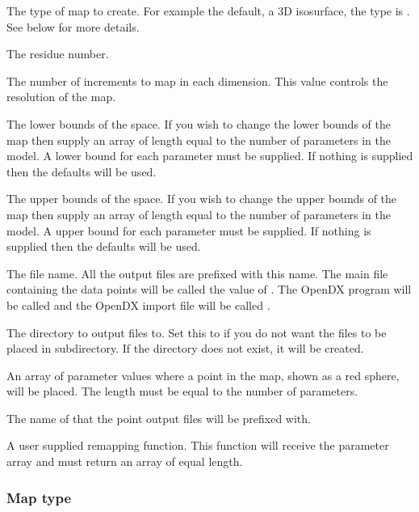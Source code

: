   The type of map to create.  For example the default, a 3D isosurface, the type is .  See below for more details. 

  The residue number. 

  The number of increments to map in each dimension.  This value controls the resolution of the map. 

  The lower bounds of the space.  If you wish to change the lower bounds of the map then supply an array of length equal to the number of parameters in the model.  A lower bound for each parameter must be supplied.  If nothing is supplied then the defaults will be used. 

  The upper bounds of the space.  If you wish to change the upper bounds of the map then supply an array of length equal to the number of parameters in the model.  A upper bound for each parameter must be supplied.  If nothing is supplied then the defaults will be used. 

  The file name.  All the output files are prefixed with this name.  The main file containing the data points will be called the value of .  The OpenDX program will be called  and the OpenDX import file will be called . 

  The directory to output files to.  Set this to  if you do not want the files to be placed in subdirectory.  If the directory does not exist, it will be created. 

  An array of parameter values where a point in the map, shown as a red sphere, will be placed.  The length must be equal to the number of parameters. 

  The name of that the point output files will be prefixed with. 

  A user supplied remapping function.  This function will receive the parameter array and must return an array of equal length. 




\subsubsection{Map type}

